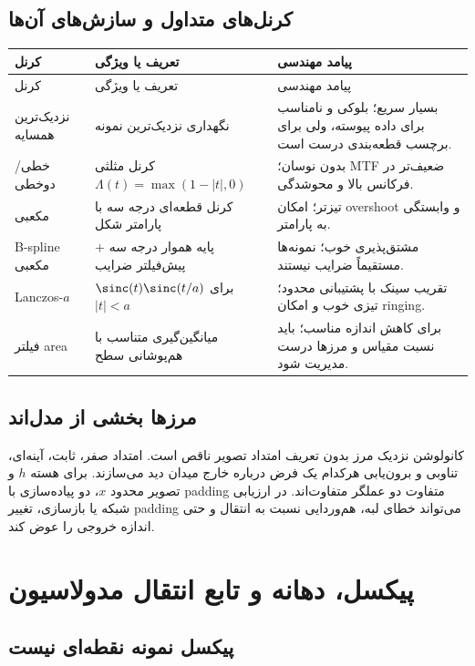 \subsection{کرنل‌های متداول و سازش‌های آن‌ها}

\begin{longtable}{p{}p{}p{}}
\toprule
کرنل & تعریف یا ویژگی & پیامد مهندسی\\
\midrule
\endfirsthead
\toprule
کرنل & تعریف یا ویژگی & پیامد مهندسی\\
\midrule
\endhead
نزدیک‌ترین همسایه & نگهداری نزدیک‌ترین نمونه & بسیار سریع؛ بلوکی و نامناسب برای داده پیوسته، ولی برای برچسب قطعه‌بندی درست است.\\
خطی/دوخطی & کرنل مثلثی \(\Lambda(t)=\max(1-|t|,0)\) & بدون نوسان؛ MTF ضعیف‌تر در فرکانس بالا و محوشدگی.\\
مکعبی & کرنل قطعه‌ای درجه سه با پارامتر شکل & تیزتر؛ امکان overshoot و وابستگی به پارامتر.\\
B-spline مکعبی & پایه هموار درجه سه + پیش‌فیلتر ضرایب & مشتق‌پذیری خوب؛ نمونه‌ها مستقیماً ضرایب نیستند.\\
Lanczos-\(a\) & \(\sinc(t)\sinc(t/a)\) برای \(|t|<a\) & تقریب سینک با پشتیبانی محدود؛ تیزی خوب و امکان ringing.\\
فیلتر area & میانگین‌گیری متناسب با هم‌پوشانی سطح & برای کاهش اندازه مناسب؛ باید نسبت مقیاس و مرزها درست مدیریت شود.\\
\bottomrule
\end{longtable}

\subsection{مرزها بخشی از مدل‌اند}

کانولوشن نزدیک مرز بدون تعریف امتداد تصویر ناقص است. امتداد صفر، ثابت، آینه‌ای، تناوبی و
برون‌یابی هرکدام یک فرض درباره خارج میدان دید می‌سازند. برای هسته \(h\) و تصویر محدود \(x\)،
دو پیاده‌سازی با padding متفاوت دو عملگر متفاوت‌اند. در ارزیابی شبکه یا بازسازی، تغییر padding
می‌تواند خطای لبه، هم‌وردایی نسبت به انتقال و حتی اندازه خروجی را عوض کند.

\section{پیکسل، دهانه و تابع انتقال مدولاسیون}

\subsection{پیکسل نمونه نقطه‌ای نیست}

